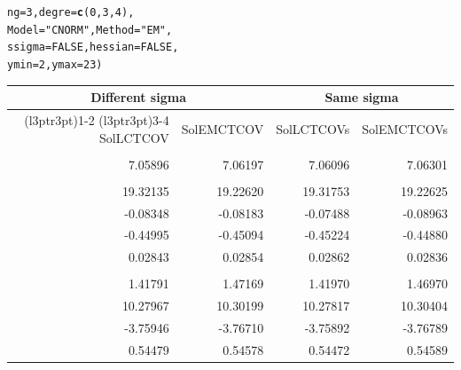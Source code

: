 \documentclass{article}\usepackage[]{graphicx}\usepackage[]{color}
\makeatletter
\newcommand{\hlnum}[1]{\textcolor[rgb]{0.686,0.059,0.569}{#1}}%
\newcommand{\hlstr}[1]{\textcolor[rgb]{0.192,0.494,0.8}{#1}}%
\newcommand{\hlstd}[1]{\textcolor[rgb]{0.345,0.345,0.345}{#1}}%
\newcommand{\hlkwc}[1]{\textcolor[rgb]{0.333,0.667,0.333}{#1}}%
\newcommand{\hlkwd}[1]{\textcolor[rgb]{0.737,0.353,0.396}{\textbf{#1}}}%
\newenvironment{kframe}{%
 \def\at@end@of@kframe{}%
 \ifinner\ifhmode%
  \def\at@end@of@kframe{\end{minipage}}%
  \begin{minipage}{\columnwidth}%
 \fi\fi%
 \def\FrameCommand##1{\hskip\@totalleftmargin \hskip-\fboxsep
 \colorbox{shadecolor}{##1}\hskip-\fboxsep
     \hskip-\linewidth \hskip-\@totalleftmargin \hskip\columnwidth}%
 \MakeFramed {\advance\hsize-\width
   \@totalleftmargin\z@ \linewidth\hsize
   \@setminipage}}%
 {\par\unskip\endMakeFramed%
 \at@end@of@kframe}
\newenvironment{knitrout}{}{} %
\makeatother
\begin{document}
\begin{knitrout}
\begin{kframe}
\begin{alltt}
                     \hlkwc{ng} \hlstd{=} \hlnum{3}\hlstd{,} \hlkwc{degre} \hlstd{=} \hlkwd{c}\hlstd{(}\hlnum{0}\hlstd{,}\hlnum{3}\hlstd{,}\hlnum{4}\hlstd{),}
                     \hlkwc{Model} \hlstd{=} \hlstr{"CNORM"}\hlstd{,} \hlkwc{Method} \hlstd{=} \hlstr{"EM"}\hlstd{,}
                     \hlkwc{ssigma} \hlstd{=} \hlnum{FALSE}\hlstd{,} \hlkwc{hessian} \hlstd{=} \hlnum{FALSE}\hlstd{,}
                     \hlkwc{ymin} \hlstd{=} \hlnum{2}\hlstd{,}  \hlkwc{ymax} \hlstd{=} \hlnum{23}\hlstd{)}
\end{alltt}
\end{kframe}
\end{knitrout}

\begin{table}[H]
\centering
\begin{tabular}{rrrr}
\toprule
\multicolumn{2}{c}{Different sigma} & \multicolumn{2}{c}{Same sigma} \\
\cmidrule(l{3pt}r{3pt}){1-2} \cmidrule(l{3pt}r{3pt}){3-4}
SolLCTCOV & SolEMCTCOV & SolLCTCOVs & SolEMCTCOVs\\
\midrule
\addlinespace[0.3em]
\multicolumn{4}{l}{\textbf{Beta 1}}\\
\hspace{1em}7.05896 & 7.06197 & 7.06096 & 7.06301\\
\addlinespace[0.3em]
\multicolumn{4}{l}{\textbf{Beta 2}}\\
\hspace{1em}19.32135 & 19.22620 & 19.31753 & 19.22625\\
\hspace{1em}-0.08348 & -0.08183 & -0.07488 & -0.08963\\
\hspace{1em}-0.44995 & -0.45094 & -0.45224 & -0.44880\\
\hspace{1em}0.02843 & 0.02854 & 0.02862 & 0.02836\\
\addlinespace[0.3em]
\multicolumn{4}{l}{\textbf{Beta 3}}\\
\hspace{1em}1.41791 & 1.47169 & 1.41970 & 1.46970\\
\hspace{1em}10.27967 & 10.30199 & 10.27817 & 10.30404\\
\hspace{1em}-3.75946 & -3.76710 & -3.75892 & -3.76789\\
\hspace{1em}0.54479 & 0.54578 & 0.54472 & 0.54589\\

\end{tabular}
\end{table}
\end{document}
